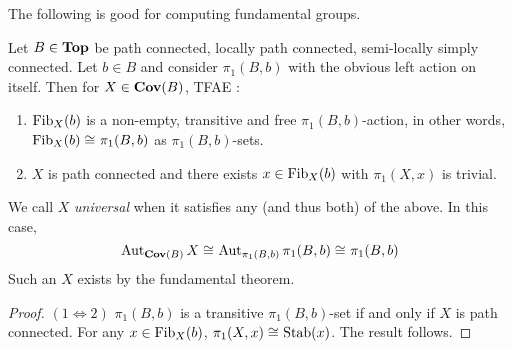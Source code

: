 \documentclass[./main.tex]{subfiles}
\begin{document}
\begin{rmk}
  The following is good for computing fundamental groups.
\end{rmk}

\begin{prop}
  
  Let $B \in \mathbf{Top}$ be path connected, locally path connected,
  semi-locally simply connected.
  Let $b \in B$ and consider $\pi_1(B,b)$ with 
  the obvious left action on itself. 
  Then for $X \in \mathbf{Cov}(B)$, TFAE : 
  \begin{enumerate}
    \item $\operatorname{Fib}_X(b)$ is a non-empty, transitive and free $\pi_1(B,b)$-action,
    in other words, $\operatorname{Fib}_X(b) \cong_{} \pi_1(B,b)$ as $\pi_1(B,b)$-sets.
    \item $X$ is path connected and 
    there exists $x \in \operatorname{Fib}_X(b)$ with $\pi_1(X,x)$ is trivial. 
  \end{enumerate}
  We call $X$ \emph{universal} when it satisfies any 
  (and thus both) of the above.
  In this case, \[
    \operatorname{Aut}_{\mathbf{Cov}(B)} X \cong_{} \operatorname{Aut}_{\pi_1(B,b)} \pi_1(B,b)
    \cong_{} \pi_1(B,b)
  \]
  Such an $X$ exists by the fundamental theorem.
  
\end{prop}
\begin{proof}
  
  \textit{$(1 \iff 2)$}
  $\pi_1(B,b)$ is a transitive $\pi_1(B,b)$-set 
  if and only if $X$ is path connected.
  For any $x \in \operatorname{Fib}_X(b)$,
  $\pi_1(X,x) \cong_{} \operatorname{Stab}(x)$.
  The result follows.

\end{proof}
\end{document}
